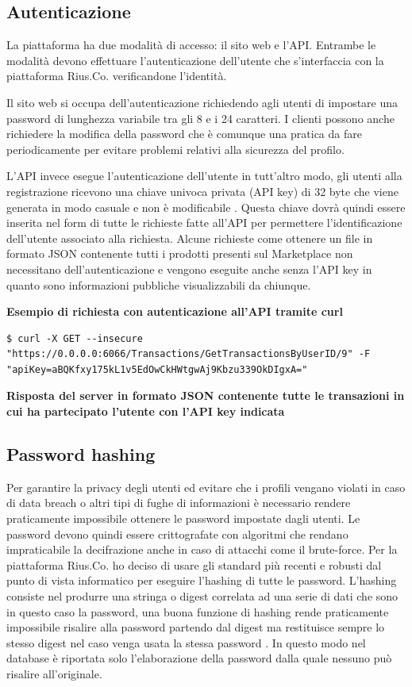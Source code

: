 \subsection{Autenticazione}
La piattaforma ha due modalità di accesso: il sito web e l'API. Entrambe le modalità devono effettuare l'autenticazione dell'utente che s'interfaccia con la piattaforma Rius.Co. verificandone l'identità. 
\medskip

Il sito web si occupa dell'autenticazione richiedendo agli utenti di impostare una password di lunghezza variabile tra gli 8 e i 24 caratteri. I clienti possono anche richiedere la modifica della password che è comunque una pratica da fare periodicamente per evitare problemi relativi alla sicurezza del profilo. 
\medskip

L'API invece esegue l'autenticazione dell'utente in tutt'altro modo, gli utenti alla registrazione ricevono una chiave univoca privata (API key) di 32 byte che viene generata in modo casuale e non è modificabile \cite{APIKEY}. Questa chiave dovrà quindi essere inserita nel form di tutte le richieste fatte all'API per permettere l'identificazione dell'utente associato alla richiesta. Alcune richieste come ottenere un file in formato JSON contenente tutti i prodotti presenti sul Marketplace non necessitano dell'autenticazione e vengono eseguite anche senza l'API key in quanto sono informazioni pubbliche visualizzabili da chiunque. 
\bigskip

\textbf{Esempio di richiesta con autenticazione all'API tramite curl}
\begin{lstlisting}[style=dos]
$ curl -X GET --insecure "https://0.0.0.0:6066/Transactions/GetTransactionsByUserID/9" -F  "apiKey=aBQKfxy175kL1v5EdOwCkHWtgwAj9Kbzu339OkDIgxA="
\end{lstlisting}
\bigskip

\textbf{Risposta del server in formato JSON contenente tutte le transazioni in cui ha partecipato l'utente con l'API key indicata} 

\subsection{Password hashing} 
Per garantire la privacy degli utenti ed evitare che i profili vengano violati in caso di data breach o altri tipi di fughe di informazioni è necessario rendere praticamente impossibile ottenere le password impostate dagli utenti. Le password devono quindi essere crittografate con algoritmi che rendano impraticabile la decifrazione anche in caso di attacchi come il brute-force. Per la piattaforma Rius.Co. ho deciso di usare gli standard più recenti e robusti dal punto di vista informatico per eseguire l'hashing di tutte le password. L'hashing consiste nel produrre una stringa o digest correlata ad una serie di dati che sono in questo caso la password, una buona funzione di hashing rende praticamente impossibile risalire alla password partendo dal digest ma restituisce sempre lo stesso digest nel caso venga usata la stessa password \cite{Hashing}. In questo modo nel database è riportata solo l'elaborazione della password dalla quale nessuno può risalire all'originale.
\medskip

